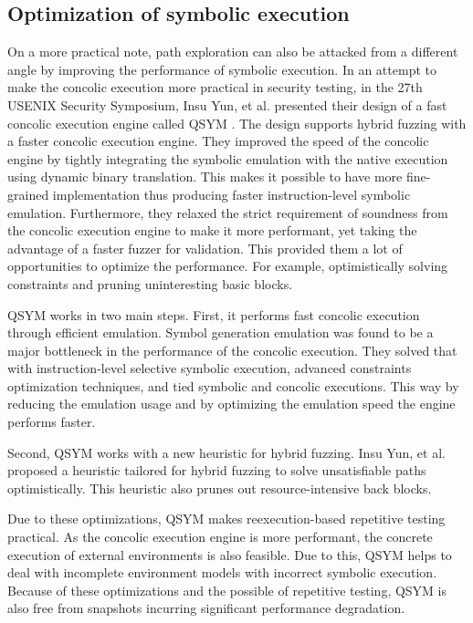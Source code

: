 \documentclass[ runningheads,
               a4paper]{llncs}
\begin{document}


\subsection{Optimization of symbolic execution}
On a more practical note, path exploration can also be attacked from a different angle by improving the performance of symbolic execution. In an attempt to make the concolic execution more practical in security testing, in the 27th USENIX Security Symposium, Insu Yun, et al. presented their design of a fast concolic execution engine called QSYM \cite{yun2018qsym}. The design supports hybrid fuzzing with a faster concolic execution engine. They improved the speed of the concolic engine by tightly integrating the symbolic emulation with the native execution using dynamic binary translation. This makes it possible to have more fine-grained implementation thus producing faster instruction-level symbolic emulation. Furthermore, they relaxed the strict requirement of soundness from the concolic execution engine to make it more performant, yet taking the advantage of a faster fuzzer for validation. This provided them a lot of opportunities to optimize the performance. For example, optimistically solving constraints and pruning uninteresting basic blocks.


QSYM \cite{yun2018qsym} works in two main steps. First, it performs fast concolic execution through efficient emulation. Symbol generation emulation was found to be a major bottleneck in the performance of the concolic execution. They solved that with instruction-level selective symbolic execution, advanced constraints optimization techniques, and tied symbolic and concolic executions. This way by reducing the emulation usage and by optimizing the emulation speed the engine performs faster.


Second, QSYM \cite{yun2018qsym} works with a new heuristic for hybrid fuzzing. Insu Yun, et al. proposed a heuristic tailored for hybrid fuzzing to solve unsatisfiable paths optimistically. This heuristic also prunes out resource-intensive back blocks.


Due to these optimizations, QSYM makes reexecution-based repetitive testing practical. As the concolic execution engine is more performant, the concrete execution of external environments is also feasible. Due to this, QSYM helps to deal with incomplete environment models with incorrect symbolic execution. Because of these optimizations and the possible of repetitive testing, QSYM is also free from snapshots incurring significant performance degradation.
\end{document}
